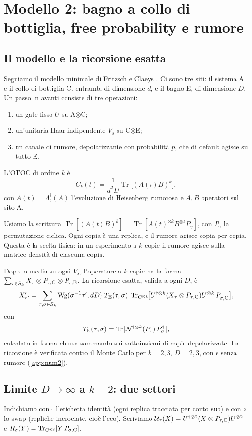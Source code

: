 \section{Modello 2: bagno a collo di bottiglia, free probability e rumore}\label{sec:bottleneck}

\CartoonModelTwo
\subsection{Il modello e la ricorsione esatta}
Seguiamo il modello minimale di Fritzsch e Claeys \cite{FC25}. Ci sono tre siti: il sistema A e il collo di bottiglia C, entrambi di dimensione $d$, e il bagno E, di dimensione $D$. Un passo in avanti consiste di tre operazioni:
\begin{enumerate}[leftmargin=2em]
\item un gate fisso $U$ su A$\otimes$C;
\item un'unitaria Haar indipendente $V_s$ su C$\otimes$E;
\item un canale di rumore, depolarizzante con probabilità $p$, che di default agisce su tutto E.
\end{enumerate}
L'OTOC di ordine $k$ è
\[
C_k(t)=\frac{1}{d^2D}\operatorname{Tr}\bigl[(A(t)B)^k\bigr],
\]
con $A(t)=\Lambda_t^\dagger(A)$ l'evoluzione di Heisenberg rumorosa e $A,B$ operatori sul sito A.

Usiamo la scrittura $\operatorname{Tr}[(A(t)B)^k]=\operatorname{Tr}[A(t)^{\otimes k}B^{\otimes k}P_\gamma]$, con $P_\gamma$ la permutazione ciclica. Ogni copia è una replica, e il rumore agisce copia per copia. Questa è la scelta fisica: in un esperimento a $k$ copie il rumore agisce sulla matrice densità di ciascuna copia.

Dopo la media su ogni $V_s$, l'operatore a $k$ copie ha la forma $\sum_{\tau\in S_k}X_\tau\otimes P_{\tau,\rm C}\otimes P_{\tau,\rm E}$. La ricorsione esatta, valida a ogni $D$, è
\[
X'_{\tau'}=\sum_{\tau,\sigma\in S_k}\mathrm{Wg}(\sigma^{-1}\tau',dD)\;T_{\rm E}(\tau,\sigma)\;\operatorname{Tr}_{\rm C^{\otimes k}}\!\bigl[U^{\dagger\otimes k}(X_\tau\otimes P_{\tau,\rm C})U^{\otimes k}\,P_{\sigma,\rm C}^\dagger\bigr],
\]
con
\[
T_{\rm E}(\tau,\sigma)=\operatorname{Tr}\bigl[\mathcal N^{\dagger\otimes k}(P_\tau)\,P^\dagger_\sigma\bigr],
\]
calcolato in forma chiusa sommando sui sottoinsiemi di copie depolarizzate. La ricorsione è verificata contro il Monte Carlo per $k=2,3$, $D=2,3$, con e senza rumore (\cref{app:num2}).

\subsection{Limite $D\to\infty$ a $k=2$: due settori}
Indichiamo con $\square$ l'etichetta identità (ogni replica tracciata per conto suo) e con $\circ$ lo swap (repliche incrociate, cioè l'eco). Scriviamo $\mathcal U_\tau(X)=U^{\dagger\otimes2}(X\otimes P_{\tau,\rm C})U^{\otimes2}$ e $R_\sigma(Y)=\operatorname{Tr}_{\rm C^{\otimes2}}[Y\,P_{\sigma,\rm C}]$.

